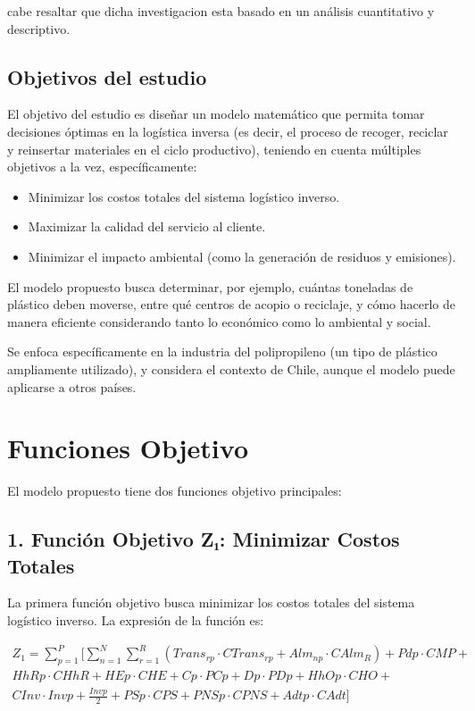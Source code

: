 \documentclass[a4paper,12pt]{article}
\begin{document}
cabe resaltar que dicha investigacion esta basado en un análisis cuantitativo y descriptivo.

\subsection*{Objetivos del estudio}
El objetivo del estudio es diseñar un modelo matemático que permita tomar decisiones óptimas en la logística inversa (es decir, el proceso de recoger, reciclar y reinsertar materiales en el ciclo productivo), teniendo en cuenta múltiples objetivos a la vez, específicamente:

\begin{itemize}
    \item Minimizar los costos totales del sistema logístico inverso.
    \item Maximizar la calidad del servicio al cliente.
    \item Minimizar el impacto ambiental (como la generación de residuos y emisiones).
\end{itemize}

El modelo propuesto busca determinar, por ejemplo, cuántas toneladas de plástico deben moverse, entre qué centros de acopio o reciclaje, y cómo hacerlo de manera eficiente considerando tanto lo económico como lo ambiental y social.

Se enfoca específicamente en la industria del polipropileno (un tipo de plástico ampliamente utilizado), y considera el contexto de Chile, aunque el modelo puede aplicarse a otros países.

\newpage

\section*{Funciones Objetivo}

El modelo propuesto tiene dos funciones objetivo principales:

\subsection*{1. Función Objetivo Z₁: Minimizar Costos Totales}
La primera función objetivo busca minimizar los costos totales del sistema logístico inverso. La expresión de la función es:

\begin{multline*}
Z_1 = \sum_{p=1}^{P} \Big[ \sum_{n=1}^{N} \sum_{r=1}^{R} 
\left( Trans_{rp} \cdot CTrans_{rp} + Alm_{np} \cdot CAlm_R \right) + Pdp \cdot CMP + \\
HhRp \cdot CHhR + HEp \cdot CHE + Cp \cdot PCp + Dp \cdot PDp + HhOp \cdot CHO + \\
CInv \cdot Invp + \frac{Invp}{2} + PSp \cdot CPS + PNSp \cdot CPNS + Adtp \cdot CAdt \Big]
\end{multline*}
\end{document}

